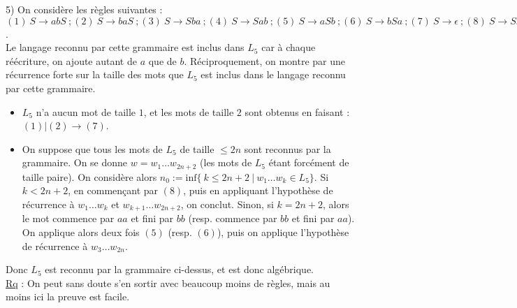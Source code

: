 \documentclass[11pt,a4paper]{article}
\begin{document}
5) On considère les règles suivantes : $(1) \ S \to abS \ ; (2) \ S \to baS \ ; (3) \ S \to Sba \ ; (4) \ S \to Sab \ ; (5) \ S \to aSb \ ; (6) \ S \to bSa \ ; (7) \ S \to \epsilon \ ; (8) \ S \to SS $. \\
Le langage reconnu par cette grammaire est inclus dans $L_5$ car à chaque réécriture, on ajoute autant de $a$ que de $b$. Réciproquement, on montre par une récurrence forte sur la taille des mots que $L_5$ est inclus dans le langage reconnu par cette grammaire.
\begin{itemize}
\item $L_5$ n'a aucun mot de taille $1$, et les mots de taille $2$ sont obtenus en faisant : $(1) | (2) \to (7)$.
\item On suppose que tous les mots de $L_5$ de taille $ \leq 2n$ sont reconnus par la grammaire. On se donne $w=w_1\dots w_{2n+2}$ (les mots de $L_5$ étant forcément de taille paire). On considère alors $n_0 := \text{inf}\{\  k \leq 2n+2 \ | \ w_1\dots w_k \in L_5 \}$. Si $k<2n+2$, en commençant par $(8)$, puis en appliquant l'hypothèse de récurrence à $w_1\dots w_k$ et $w_{k+1}\dots w_{2n+2}$, on conclut. Sinon, si $k=2n+2$, alors le mot commence par $aa$ et fini par $bb$ (resp. commence par $bb$ et fini par $aa$). On applique alors deux fois $(5)$ (resp. $(6)$), puis on applique l'hypothèse de récurrence à $w_3\dots w_{2n}$.
\end{itemize}
Donc $L_5$ est reconnu par la grammaire ci-dessus, et est donc algébrique.
\\

\underline{Rq} : On peut sans doute s'en sortir avec beaucoup moins de règles, mais au moins ici la preuve est facile.
\end{document}
